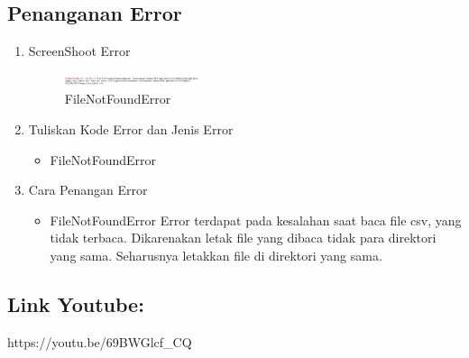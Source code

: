 \subsection{Penanganan Error}
\begin{enumerate}
	\item ScreenShoot Error
	\begin{figure}[H]
		\includegraphics[width=4cm]{figures/1174080/3/error1.jpg}
		\centering
		\caption{FileNotFoundError}
	\end{figure}
	\item Tuliskan Kode Error dan Jenis Error
	\begin{itemize}
		\item FileNotFoundError
	\end{itemize}
	\item Cara Penangan Error
	\begin{itemize}
		\item FileNotFoundError
		\hfill\break
		Error terdapat pada kesalahan saat baca file csv, yang tidak terbaca. Dikarenakan letak file yang dibaca tidak para direktori yang sama. Seharusnya letakkan file di direktori yang sama. 
	\end{itemize}
\end{enumerate}

\subsection{Link Youtube:}
https://youtu.be/69BWGlcf\_CQ